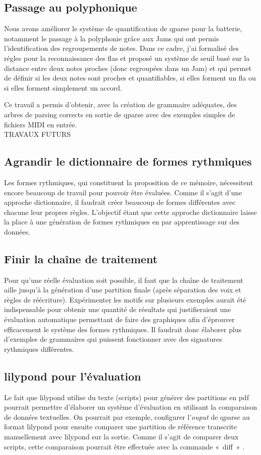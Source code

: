 \subsection*{Passage au polyphonique}
Nous avons améliorer le système de quantification de qparse pour la batterie,
notamment le passage à la polyphonie grâce aux Jams qui ont permis
l’identification des regroupements de notes. Dans ce cadre, j’ai formalisé des
régles pour la reconnaissance des flas et proposé un système de seuil basé sur
la distance entre deux notes proches (donc regroupées dans un Jam) et qui
permet de définir si les deux notes sont proches et quantifiables, si elles
forment un fla ou si elles forment simplement un accord.

Ce travail a permis d’obtenir, avec la création de grammaire adéquates, des
arbres de parsing corrects en sortie de qparse avec des exemples simples de
fichiers MIDI en entrée.\\

TRAVAUX FUTURS
\subsection*{Agrandir le dictionnaire de formes rythmiques}
Les formes rythmiques, qui constituent la proposition de ce mémoire,
nécessitent encore beaucoup de travail pour pouvoir être évaluées. Comme il
s’agit d’une approche dictionnaire, il faudrait créer beaucoup de formes
différentes avec chacune leur propres règles. L’objectif étant que cette
approche dictionnaire laisse la place à une génération de formes rythmiques en
par apprentissage sur des données.

\subsection*{Finir la chaîne de traitement}
Pour qu’une réelle évaluation soit possible, il faut que la chaîne de
traitement aille jusqu’à la génération d’une partition finale (après séparation
des voix et règles de réécriture). Expérimenter les motifs sur plusieurs
exemples aurait été indispensable pour obtenir une quantité de résultats qui
justifieraient une évaluation automatique permettant de faire des graphiques afin
d’éprouver efficacement le système des formes rythmiques. Il faudrait donc
élaborer plus d’exemples de grammaires qui puissent fonctionner avec des
signatures rythmiques différentes.\\

\subsection*{lilypond pour l’évaluation}
Le fait que lilypond utilise du texte (scripts) pour générer des partitions en
pdf pourrait permettre d’élaborer un système d’évaluation en utilisant la
comparaison de données textuelles. On pourrait par exemple, configurer
l’\textit{ouput} de qparse au format lilypond pour ensuite comparer une
partition de référence transcrite manuellement avec lilypond sur la sortie.
Comme il s’agit de comparer deux scripts, cette comparaison pourrait être
effectuée avec la commande «~diff~» .
